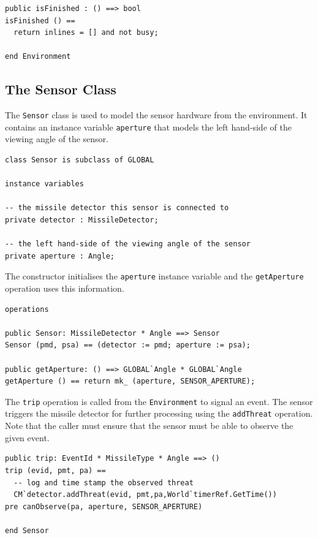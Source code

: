 \documentclass{overturerepchap}
\begin{document}
\begin{lstlisting}
public isFinished : () ==> bool
isFinished () == 
  return inlines = [] and not busy;

end Environment
\end{lstlisting}

\subsection{The Sensor Class}

The \texttt{Sensor} class is used to model the sensor hardware from
the environment. It contains an instance variable \texttt{aperture}
that models the left hand-side of the viewing angle of the sensor.

\begin{lstlisting}
class Sensor is subclass of GLOBAL

instance variables

-- the missile detector this sensor is connected to
private detector : MissileDetector;

-- the left hand-side of the viewing angle of the sensor
private aperture : Angle;
\end{lstlisting}

The constructor initialises the \texttt{aperture} instance variable and the 
\texttt{getAperture} operation uses this information.

\begin{lstlisting}
operations

public Sensor: MissileDetector * Angle ==> Sensor
Sensor (pmd, psa) == (detector := pmd; aperture := psa);

public getAperture: () ==> GLOBAL`Angle * GLOBAL`Angle
getAperture () == return mk_ (aperture, SENSOR_APERTURE);
\end{lstlisting}

The \texttt{trip} operation is called from the \texttt{Environment} to
signal an event. The sensor triggers the missile detector for further 
processing using the \texttt{addThreat} operation. Note that the caller
must ensure that the sensor must be able to observe the given event.

\begin{lstlisting}
public trip: EventId * MissileType * Angle ==> ()
trip (evid, pmt, pa) ==
  -- log and time stamp the observed threat
  CM`detector.addThreat(evid, pmt,pa,World`timerRef.GetTime())
pre canObserve(pa, aperture, SENSOR_APERTURE)

end Sensor
\end{lstlisting}
\end{document}
